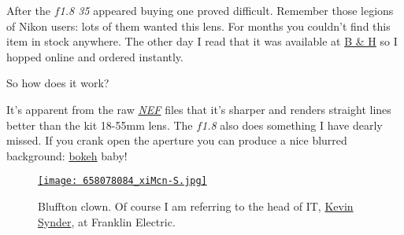 After the \emph{$f$1.8 35} appeared buying one proved difficult. Remember
those legions of Nikon users: lots of them wanted this lens. For months
you couldn't find this item in stock anywhere. The other day I read that
it was available at \href{http://www.bhphotovideo.com/}{B \& H} so I
hopped online and ordered instantly.

So how does it work?

It's apparent from the raw
\emph{\href{http://filext.com/file-extension/NEF}{NEF}} files that it's
sharper and renders straight lines better than the kit 18-55mm lens. The
\emph{$f$1.8} also does something I have dearly missed. If you crank open
the aperture you can produce a nice blurred background:
\href{http://en.wikipedia.org/wiki/Bokeh}{bokeh} baby!


\begin{figure}[htbp]
\centering
\href{http://conceptcontrol.smugmug.com/Places/USA-and-Canada/Indiana-Images/9710712\_PrYQj\#658078084\_xiMcn}{\texttt{[image: 658078084\_xiMcn-S.jpg]}}
\caption[Bluffton Indiana clown]{Bluffton clown. Of course I am referring to the head of IT, \href{http://www.linkedin.com/pub/kevin-snyder/25/345/9a3}{Kevin Synder}, at Franklin Electric. }
\label{fig:88X1}
\end{figure}




%